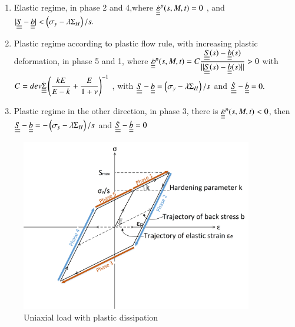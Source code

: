 \documentclass[3p,times,number,review]{elsarticle}
\begin{document}
\vspace{6pt}
\begin{enumerate}
	
	\item	Elastic regime, in phase 2 and 4,where $\dot{\uline{\uline{\varepsilon}}}^p(s,M,t)=0$ ,  and $|\uline{\uline{S}}-\uline{\uline{b}}|< \left( \sigma_y-\lambda \Sigma_H\right)/s. $ 
	\vspace{6pt}
	
	\item Plastic regime according to plastic flow rule, with increasing plastic deformation, in phase 5 and 1, where	$\dot{\uline{\uline{\varepsilon}}}^p(s,M,t)=C\dfrac{\uline{\uline{S}}(s)-\uline{\uline{b}}(s)}{||\uline{\uline{S}}(s)-\uline{\uline{b}}(s)||}> 0$ with  $C= dev\dot{\uline{\uline{\Sigma}}}\left(\dfrac{kE}{E-k}+\dfrac{E}{1+\nu} \right) ^{-1}$ ,  with $\uline{\uline{S}}-\uline{\uline{b}}= \left(\sigma_y-\lambda \Sigma_H\right)/s$ and $\dot{\uline{\uline{S}}}-\dot{\uline{\uline{b}}}=0.$ 
	\vspace{6pt}
	
	\item Plastic regime in the other direction, in phase 3, there is	$\dot{\uline{\uline{\varepsilon}}}^p(s,M,t)<0$,  then $\uline{\uline{S}}-\uline{\uline{b}}=- \left(\sigma_y-\lambda \Sigma_H\right)/s$ and $\dot{\uline{\uline{S}}}-\dot{\uline{\uline{b}}}=0$ 
	
\end{enumerate}	

\begin{figure}[!h]
	\centering
	\includegraphics[width=0.9\textwidth]{figures//backstress.png} 
	\caption{Uniaxial load with plastic dissipation}
	\label{backstress}
\end{figure}
\end{document}
